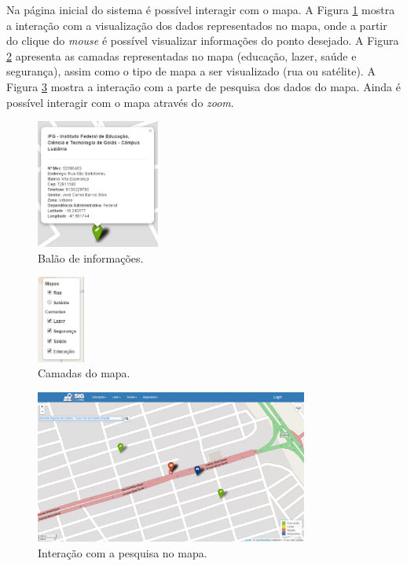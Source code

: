 \newpage

Na página inicial do sistema é possível interagir com o mapa. A Figura \ref{fig:BalaoInformacoes} mostra a interação com a visualização dos dados representados no mapa, onde a partir do clique do \textit{mouse} é possível visualizar informações do ponto desejado. A Figura \ref{fig:Camadas} apresenta as camadas representadas no mapa (educação, lazer, saúde e segurança), assim como o tipo de mapa a ser visualizado (rua ou satélite). A Figura \ref{fig:PesquisaMapa} mostra a interação com a parte de pesquisa dos dados do mapa. Ainda é possível interagir com o mapa através do \textit{zoom}.

\begin{figure}[h]
\centering
\includegraphics[width=0.36\textwidth]{./img/cap_IV/6-BalaoInformacoes}
\caption{Balão de informações.}
\label{fig:BalaoInformacoes}
\end{figure}

\begin{figure}[h]
\centering
\includegraphics[width=0.14\textwidth]{./img/cap_IV/7-Camadas}
\caption{Camadas do mapa.}
\label{fig:Camadas}
\end{figure}

\begin{figure}[h]
\centering
\includegraphics[width=0.80\textwidth]{./img/cap_IV/8-PesquisaMapa}
\caption{Interação com a pesquisa no mapa.}
\label{fig:PesquisaMapa}
\end{figure}

